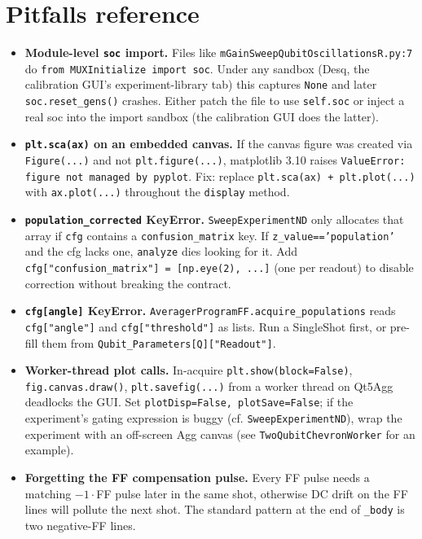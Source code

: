 \documentclass[11pt,letterpaper]{article}
\begin{document}
\section{Pitfalls reference}
\begin{itemize}[leftmargin=*]
  \item \textbf{Module-level \texttt{soc} import.} Files like \texttt{mGainSweepQubitOscillationsR.py:7} do \texttt{from MUXInitialize import soc}. Under any sandbox (Desq, the calibration GUI's experiment-library tab) this captures \texttt{None} and later \texttt{soc.reset\_gens()} crashes. Either patch the file to use \texttt{self.soc} or inject a real soc into the import sandbox (the calibration GUI does the latter).
  \item \textbf{\texttt{plt.sca(ax)} on an embedded canvas.} If the canvas figure was created via \texttt{Figure(...)} and not \texttt{plt.figure(...)}, matplotlib 3.10 raises \texttt{ValueError: figure not managed by pyplot}. Fix: replace \texttt{plt.sca(ax) + plt.plot(...)} with \texttt{ax.plot(...)} throughout the \texttt{display} method.
  \item \textbf{\texttt{population\_corrected} KeyError.} \texttt{SweepExperimentND} only allocates that array if \texttt{cfg} contains a \texttt{confusion\_matrix} key. If \texttt{z\_value=='population'} and the cfg lacks one, \texttt{analyze} dies looking for it. Add \texttt{cfg["confusion\_matrix"] = [np.eye(2), ...]} (one per readout) to disable correction without breaking the contract.
  \item \textbf{\texttt{cfg[\textquotesingle angle\textquotesingle]} KeyError.} \texttt{AveragerProgramFF.acquire\_populations} reads \texttt{cfg["angle"]} and \texttt{cfg["threshold"]} as lists. Run a SingleShot first, or pre-fill them from \texttt{Qubit\_Parameters[Q]["Readout"]}.
  \item \textbf{Worker-thread plot calls.} In-acquire \texttt{plt.show(block=False)}, \texttt{fig.canvas.draw()}, \texttt{plt.savefig(...)} from a worker thread on Qt5Agg deadlocks the GUI. Set \texttt{plotDisp=False, plotSave=False}; if the experiment's gating expression is buggy (cf. \texttt{SweepExperimentND}), wrap the experiment with an off-screen Agg canvas (see \texttt{TwoQubitChevronWorker} for an example).
  \item \textbf{Forgetting the FF compensation pulse.} Every FF pulse needs a matching \(-1 \cdot\)FF pulse later in the same shot, otherwise DC drift on the FF lines will pollute the next shot. The standard pattern at the end of \texttt{\_body} is two negative-FF lines.
\end{itemize}
\end{document}
